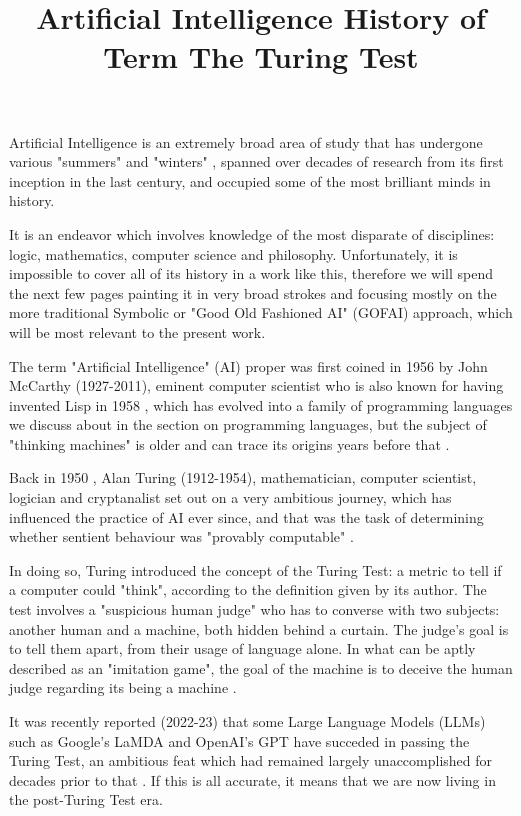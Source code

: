 \title{ Artificial Intelligence}

Artificial Intelligence is an extremely broad area of study that has undergone various "summers" and "winters" \cite{ilkou2020symbolic}, spanned over decades of research from its first inception in the last century, and occupied some of the most brilliant minds in history.

It is an endeavor which involves knowledge of the most disparate of disciplines: logic, mathematics, computer science and philosophy. Unfortunately, it is impossible to cover all of its history in a work like this, therefore we will spend the next few pages painting it in very broad strokes and focusing mostly on the more traditional Symbolic or "Good Old Fashioned AI" (GOFAI) approach, which will be most relevant to the present work.

\title{ History of Term}

The term "Artificial Intelligence" (AI) proper was first coined in 1956 by John McCarthy (1927-2011), eminent computer scientist who is also known for having invented Lisp in 1958 \cite{lisproots}, which has evolved into a family of programming languages we discuss about in the section on programming languages, but the subject of "thinking machines" is older and can trace its origins years before that \cite{smith2006history}.

\title{ The Turing Test}

Back in 1950 \cite{turing2009computing}, Alan Turing (1912-1954), mathematician, computer scientist, logician and cryptanalist set out on a very ambitious journey, which has influenced the practice of AI ever since, and that was the task of determining whether sentient behaviour was "provably computable" \cite{smith2006history}.


In doing so, Turing introduced the concept of the Turing Test: a metric to tell if a computer could "think", according to the definition given by its author. The test involves a "suspicious human judge" who has to converse with two subjects: another human and a machine, both hidden behind a curtain. The judge's goal is to tell them apart, from their usage of language alone. In what can be aptly described as an "imitation game", the goal of the machine is to deceive the human judge regarding its being a machine \cite{smith2006history}.

It was recently reported (2022-23) that some Large Language Models (LLMs) such as Google's LaMDA \cite{turingtestobsolete} and OpenAI's GPT \cite{gptbroketuring} have succeded in passing the Turing Test, an ambitious feat which had remained largely unaccomplished for decades prior to that \cite{smith2006history}. If this is all accurate, it means that we are now living in the post-Turing Test era.

